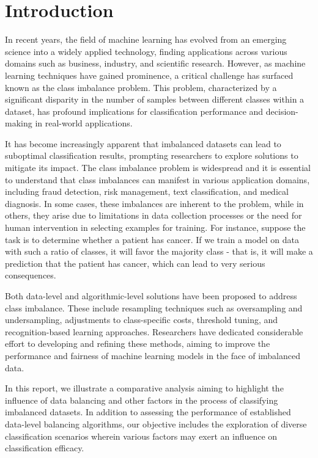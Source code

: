 \section{Introduction}

In recent years, the field of machine learning has evolved from an emerging science into a widely applied technology, finding applications across various domains such as business, industry, and scientific research. However, as machine learning techniques have gained prominence, a critical challenge has surfaced known as the class imbalance problem. This problem, characterized by a significant disparity in the number of samples between different classes within a dataset, has profound implications for classification performance and decision-making in real-world applications.

It has become increasingly apparent that imbalanced datasets can lead to suboptimal classification results, prompting researchers to explore solutions to mitigate its impact. 
The class imbalance problem is widespread and it is essential to understand that class imbalances can manifest in various application domains, including fraud detection, risk management, text classification, and medical diagnosis. In some cases, these imbalances are inherent to the problem, while in others, they arise due to limitations in data collection processes or the need for human intervention in selecting examples for training.  For instance, suppose the task is to determine whether a patient has cancer. If we train a model on data with such a ratio of classes, it will favor the majority class - that is, it will make a prediction that the patient has cancer, which can lead to very serious consequences.

Both data-level and algorithmic-level solutions have been proposed to address class imbalance. These include resampling techniques such as oversampling and undersampling, adjustments to class-specific costs, threshold tuning, and recognition-based learning approaches. Researchers have dedicated considerable effort to developing and refining these methods, aiming to improve the performance and fairness of machine learning models in the face of imbalanced data.

In this report, we illustrate a comparative analysis aiming to highlight the influence of data balancing and other factors in the process of classifying imbalanced datasets. In addition to assessing the performance of established data-level balancing algorithms, our objective includes the exploration of diverse classification scenarios wherein various factors may exert an influence on classification efficacy.

